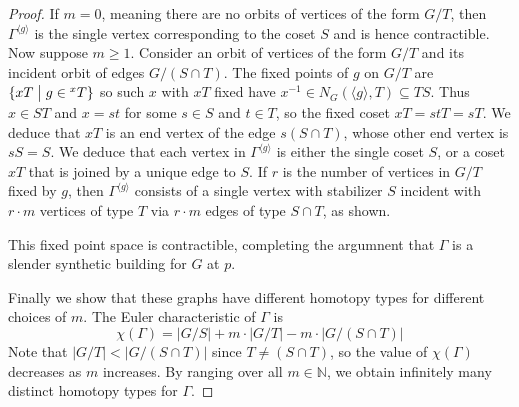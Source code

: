 \documentclass[12pt]{amsart}
\theoremstyle{plain}
\theoremstyle{definition}
\theoremstyle{remark}
\numberwithin{equation}{section}
\def\NN{{\mathbb N}}
\begin{document}
\begin{proof}
If $m=0$, meaning there are no orbits of vertices of the form $G/T$, then $\Gamma^{\langle g\rangle}$ is the single vertex corresponding to the coset $S$ and is hence contractible. Now suppose $m\geq1$. Consider an orbit of vertices of the form $G/T$ and its incident orbit of edges $G/(S\cap T)$. 
The fixed points of $g$ on $G/T$ are $\{xT\bigm| g\in {}^xT\}$ so such $x$ with $xT$ fixed have $x^{-1}\in N_G(\langle g\rangle,T) \subseteq TS$. Thus $x\in ST$ and $x=st$ for some $s\in S$ and $t\in T$, so the fixed coset $xT = stT = sT$. We deduce that $xT$ is an end vertex of the edge $s(S\cap T)$, whose other end vertex is $sS = S$. We deduce that each vertex in $\Gamma^{\langle g\rangle}$ is either the single coset $S$, or a coset $xT$ that is joined by a unique edge to $S$. If $r$ is the number of vertices in $G/T$ fixed by $g$, then $\Gamma^{\langle g\rangle}$ consists of a single vertex with stabilizer $S$ incident with $r\cdot m$ vertices of type $T$ via $r\cdot m$ edges of type $S\cap T$, as shown. 
    \begin{center}
    \end{center}
    \noindent This fixed point space is contractible, completing the argumnent that $\Gamma$ is a slender synthetic building for $G$ at $p$.

    Finally we show that these graphs have different homotopy types for different choices of $m$. The Euler characteristic of $\Gamma$ is
    $$\chi(\Gamma)=|G/S|+m\cdot|G/T|-m\cdot|G/(S\cap T)|$$
    Note that $|G/T|<|G/(S\cap T)|$ since $T\ne (S\cap T)$, so the value of $\chi(\Gamma)$ decreases as $m$ increases. By ranging over all $m\in\NN$, we obtain infinitely many distinct homotopy types for $\Gamma$. 
    \end{proof}
\end{document}
